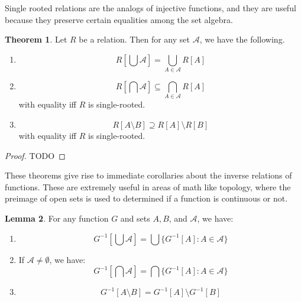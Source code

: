 \documentclass[11pt, oneside]{article}   	%
\theoremstyle{definition}
\newtheorem{theorem}{Theorem}[section]
\newtheorem{lemma}[theorem]{Lemma}
\begin{document}
Single rooted relations are the analogs of injective functions, and they are useful because they preserve certain equalities 
among the set algebra.

\begin{theorem}
	Let $R$ be a relation. Then for any set $\mathcal A$, we have the following.
	\begin{enumerate}
		\item \begin{equation}R\left[\bigcup\mathcal A\right] = \bigcup_{A\in\mathcal A}R[A]\end{equation}
		\item \begin{equation}R\left[\bigcap\mathcal A\right]\subseteq \bigcap_{A\in\mathcal A} R\left[A\right]\end{equation} 
		with equality iff $R$ is single-rooted.
		\item \begin{equation}R\left[A\setminus B\right]\supseteq R\left[A\right]\setminus R\left[B\right]\end{equation} with 
		equality iff $R$ is single-rooted.
	\end{enumerate}
\end{theorem}
\begin{proof} TODO \end{proof}

These theorems give rise to immediate corollaries about the inverse relations of functions. These are extremely useful in 
areas of math like topology, where the preimage of open sets is used to determined if a function is continuous or not.

\begin{lemma}
	For any function $G$ and sets $A, B$, and $\mathcal A$, we have:
	\begin{enumerate}
		\item \begin{equation}G^{-1}\left[\bigcup\mathcal A\right] = \bigcup\{G^{-1}[A] : A\in\mathcal A\}\end{equation}
		\item If $\mathcal A\neq\emptyset$, we have:
		\begin{equation}
			G^{-1}\left[\bigcap\mathcal A\right] = \bigcap\{G^{-1}[A] : A\in\mathcal A\}
		\end{equation}
		\item \begin{equation}G^{-1}[A\setminus B] = G^{-1}[A]\setminus G^{-1}[B]\end{equation}
	\end{enumerate}
\end{lemma}
\end{document}
